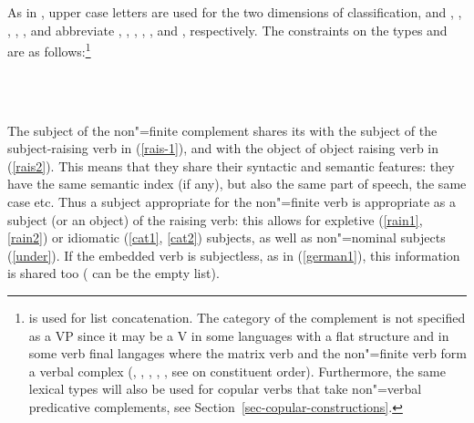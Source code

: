 \documentclass[output=paper
	        ,collection
	        ,collectionchapter
 	        ,biblatex
                ,babelshorthands
                ,newtxmath
                ,draftmode
                ,colorlinks, citecolor=brown
]{langscibook}
\begin{document}
As in , upper case letters
are used for the two dimensions of classification, and , , ,
, ,  and  abbreviate
, , ,
, , 
and , respectively.  The constraints on the types  and
 are as follows:\footnote{%
\append  is used for list concatenation. The category of the complement is not specified as a VP
since it may be a V in some  languages with a flat structure \citep{AG2003a-u} and in
some verb final langages where the matrix verb and the non"=finite verb form a verbal complex
(, , , , , see
 on constituent order). Furthermore, the same lexical types will also be
used for copular verbs that take non"=verbal predicative complements, see
Section~\ref{sec-copular-constructions}.%
}

\eal
\label{rsg}
\ex {} \impl\\
\avm{ [ \argst  \1 \+ < [subj & \1 ] > ]} \label{rais-1}
\ex {}  \impl\\
\avm{ [ \argst  < NP > \+ \1 \+ < [subj & \1 ] > ]} \label{rais2}
\zl


The subject of the non"=finite complement shares its  with the subject of
the subject-raising verb in (\ref{rais-1}), and with the object of object raising verb in
(\ref{rais2}). This means that they share their syntactic and semantic features: they have the same
semantic index (if any), but also the same part of speech, the same case etc. Thus a subject
appropriate for the non"=finite verb is appropriate as a subject (or an object) of the raising verb:
this allows for expletive (\ref{rain1}, \ref{rain2}) or idiomatic (\ref{cat1}, \ref{cat2}) subjects,
as well as non"=nominal subjects (\ref{under}). If the embedded verb is subjectless, as in
(\ref{german1}), this information is shared too ( can be the empty list). 
\end{document}
